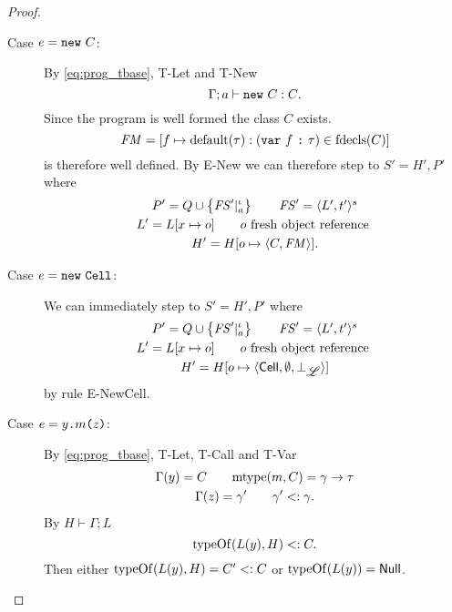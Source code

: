 \begin{proof}
\begin{description}
\begin{description}
        \item[Case $e = \mbox{\mdseries\texttt{new}~$C$}$:]
          By \eqref{eq:prog_tbase}, {\sc T-Let} and {\sc T-New}
          \begin{equation*}
            \mbox{$\Gamma;a\vdash\mbox{\mdseries\texttt{new}~$C$}:C$}.
          \end{equation*}
          Since the program is well formed the class $C$ exists. 
          \begin{equation*}
            \mathit{FM} = [f \mapsto \mbox{$\mathrm{default}$}(\tau): (\mbox{\mdseries\texttt{var}~$f$~\texttt{:}~$\tau$}) \in \mbox{$\mathrm{fdecls}$}(C)]
          \end{equation*}
          is therefore well defined. By {\sc E-New} we can therefore step to $S'
          = H', P'$ where
          \begin{equation*}
            \begin{gathered}
              P' = Q \cup \left\{\mathit{FS}'|_a^\iota \right\} \quad\quad \mathit{FS}' = \mbox{$\langle L',
              t' \rangle^s$} \\
              L' = L[x \mapsto o] \quad\quad o \text{ fresh object reference } \\
              H' = H[o \mapsto \mbox{$\langle C, \mathit{FM} \rangle$}].
            \end{gathered}
          \end{equation*}
          \contradiction

        \item[Case $e = \mbox{\mdseries\texttt{new}~\texttt{Cell}}$:]
          We can immediately step to $S' = H', P'$ where
          \begin{equation*}
            \begin{gathered}
              P' = Q \cup \left\{\mathit{FS}'|_a^\iota \right\} \quad\quad \mathit{FS}' = \mbox{$\langle L',
              t' \rangle^s$} \\
              L' = L[x \mapsto o] \quad\quad o \text{ fresh object reference } \\
              H' = H[o \mapsto \mbox{$\langle \mbox{$\mathsf{Cell}$}{}, \emptyset, \bot_{\mbox{$\mathscr{L}$}} \rangle$}]
            \end{gathered}
          \end{equation*}
          by rule {\sc E-NewCell}. \contradiction
      
        \item[Case $e = \mbox{\mdseries$y$\texttt{.}$m$\texttt{(}$z$\texttt{)}}$:]
          By \eqref{eq:prog_tbase}, {\sc T-Let}, {\sc T-Call} and {\sc T-Var}
          \begin{equation*}
            \begin{gathered}
              \Gamma(y) = C \quad\quad \mbox{$\mathrm{mtype}$}(m, C) = \gamma \to \tau \\
              \Gamma(z) = \gamma' \quad\quad \gamma' <: \gamma.
            \end{gathered}
          \end{equation*}
          By $H \vdash \Gamma;L$ 
          \begin{equation*}
            \mbox{$\mathrm{typeOf}$}(L(y), H) <: C.
          \end{equation*}
          Then either $\mbox{$\mathrm{typeOf}$}(L(y), H) = C' <: C$ or $\mbox{$\mathrm{typeOf}$}(L(y)) =
          \mbox{$\mathsf{Null}$}$.


\end{description}
\end{description}
\end{proof}
